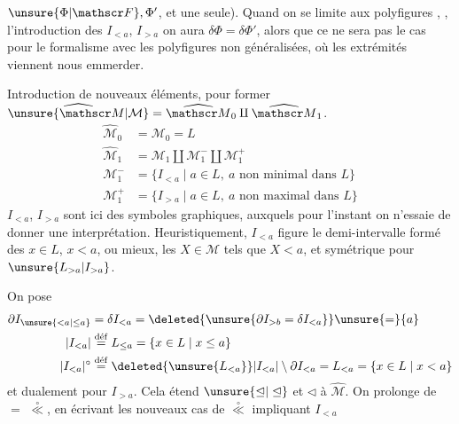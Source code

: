 
$\unsure{\Phi|\mathscr F},\Phi'$, et une seule).  Quand on se limite aux polyfigures , ,  l'introduction des $I_{<a}$, $I_{>a}$ on aura $\delta\Phi=\delta\Phi'$, alors que ce ne sera pas le cas pour le formalisme avec les polyfigures non généralisées, où les extrémités  viennent nous emmerder.

Introduction de nouveaux éléments, pour former $\widehat{\unsure{\mathscr M|\mathcal M}}=\widehat{\mathscr M}_0\amalg\widehat{\mathscr M}_1$.
\[
\begin{aligned}
\widehat{\mathscr M}_0&=\mathscr M_0=L\\
\widehat{\mathscr M}_1&=\mathscr M_1\amalg\mathscr M_1^-\amalg\mathscr M_1^+\\
\mathscr M_1^-&=\{I_{<a}\mid a\in L,\ a\text{ non minimal dans }L\}\\
\mathscr M_1^+&=\{I_{>a}\mid a\in L,\ a\text{ non maximal dans }L\}
\end{aligned}
\]
$I_{<a}$, $I_{>a}$  sont ici des symboles graphiques, auxquels pour l'instant on n'essaie de donner une interprétation. Heuristiquement,  $I_{<a}$ figure le demi-intervalle formé des $x\in L$, $x<a$, ou mieux, les $X\in\mathscr M$ tels que $X<a$, et symétrique pour $\unsure{L_{>a}|I_{>a}}$.

On pose
\[
\begin{aligned}
\partial I_{\unsure{<a|\leq a}}&=\delta I_{<a}=\deleted{\unsure{\partial I_{>b}=\delta I_{<a}}}\unsure{=}\{a\}\\
|I_{<a}|&\overset{\mathrm{d\acute ef}}{=}L_{\leq a}=\{x\in L\mid x\leq a\}\\
|I_{<a}|^\circ&\overset{\mathrm{d\acute ef}}{=}\deleted{\unsure{L_{<a}}}|I_{<a}|\setminus\partial I_{<a}=L_{<a}=\{x\in L\mid x<a\}
\end{aligned}
\]
et dualement pour $I_{>a}$. Cela étend $\unsure{\unlhd|\trianglelefteq}$ et $\triangleleft$ à $\widehat{\mathscr M}$. On  prolonge de $=$ $\overset{\circ}{\ll}$, en écrivant les nouveaux cas de $\overset{\circ}{\ll}$ impliquant $I_{<a}$

